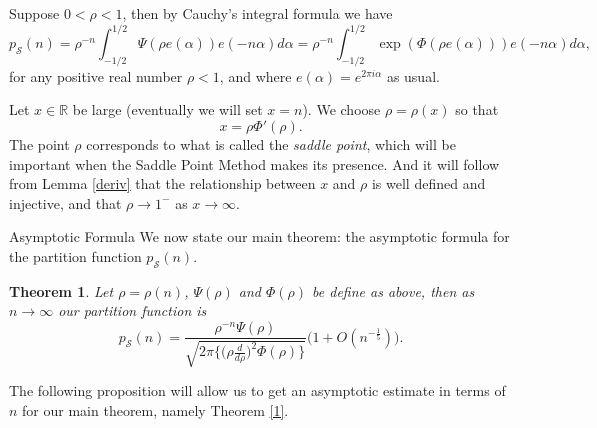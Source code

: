 \documentclass[12pt,reqno]{amsart}
\makeatletter
\def\section{\@startsection{section}{1}
  \z@{.7\linespacing\@plus\linespacing}{.5\linespacing}
  {\normalfont\scshape\bfseries}}
\newtheorem{theorem}{Theorem}[section]
\makeatother
\begin{document}
Suppose  $0<\rho<1$, then by Cauchy's integral formula we have
\begin{equation}\label{Cauchy}
    p_\mathcal{S}(n)=\rho^{-n}\int_{-1/2}^{1/2} \Psi(\rho e(\alpha)) e(-n\alpha) d\alpha = \rho^{-n} \int_{-1/2}^{1/2} \exp(\Phi(\rho e(\alpha))) e(-n\alpha) d\alpha,
\end{equation}
for any positive real number $\rho<1$, and where $e(\alpha)=e^{2\pi i \alpha}$ as usual. 

Let $x\in \mathbb{R}$ be large (eventually we will set $x=n$). We choose $\rho=\rho(x)$ so that
\begin{equation}\label{def}
    x=\rho \Phi'(\rho).
\end{equation}
The point $\rho$ corresponds to what is called the \textit{saddle point}, which will be important when the Saddle Point Method makes its presence. And it will follow from Lemma \ref{deriv} that the relationship between $x$ and $\rho$ is well defined and injective, and that $\rho \to 1^-$ as $x \to \infty$.



\section{Asymptotic Formula} \label{results}
We now state our main theorem: the asymptotic formula for the partition function $p_\mathcal{S}(n)$.

\begin{theorem}\label{main}
Let $\rho=\rho(n)$, $\Psi(\rho)$ and $\Phi(\rho)$ be define as above, then as $n\to \infty$ our partition function is
    \begin{equation*}
        p_\mathcal{S}(n)=\frac{\rho^{-n}\Psi(\rho)}{\sqrt{2 \pi \Big\{\Big(\rho\frac{d}{d\rho}\Big)^2 \Phi(\rho)\Big\}}}\Big(1+O(n^{-\frac{1}{5}})\Big).
    \end{equation*}
\end{theorem}

The following proposition will allow us to get an asymptotic estimate in terms of $n$ for our main theorem, namely Theorem \ref{1}.
\end{document}
